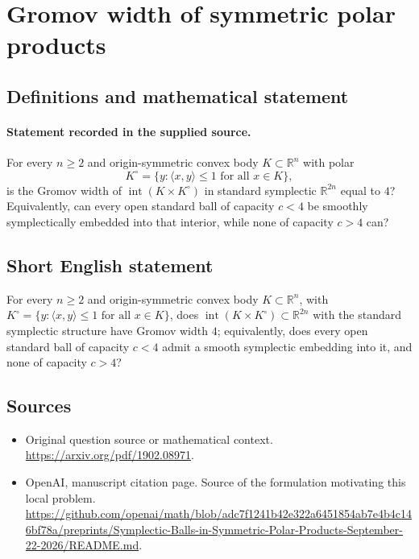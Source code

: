\documentclass[11pt]{article}
\begin{document}
\section*{Gromov width of symmetric polar products}\label{30007128}
\subsection{Definitions and mathematical statement}
\paragraph{Statement recorded in the supplied source.}
For every $n\geq2$ and origin-symmetric convex body $K\subset\mathbb{R}^n$ with polar
\[
K^\circ=\{y:\langle x,y\rangle\leq1\text{ for all }x\in K\},
\]
is the Gromov width of $\operatorname{int}(K\times K^\circ)$ in standard symplectic $\mathbb{R}^{2n}$ equal to $4$? Equivalently, can every open standard ball of capacity $c<4$ be smoothly symplectically embedded into that interior, while none of capacity $c>4$ can?
\subsection{Short English statement}
For every $n\geq2$ and origin-symmetric convex body $K\subset\mathbb{R}^n$, with $K^\circ=\{y:\langle x,y\rangle\leq1\text{ for all }x\in K\}$, does $\operatorname{int}(K\times K^\circ)\subset\mathbb{R}^{2n}$ with the standard symplectic structure have Gromov width $4$; equivalently, does every open standard ball of capacity $c<4$ admit a smooth symplectic embedding into it, and none of capacity $c>4$?
\subsection{Sources}
\begin{itemize}
\item[S1] Original question source or mathematical context.
\url{https://arxiv.org/pdf/1902.08971}.
\item[S2] OpenAI, manuscript citation page. Source of the formulation motivating this local problem.
\url{https://github.com/openai/math/blob/adc7f1241b42e322a6451854ab7e4b4c146bf78a/preprints/Symplectic-Balls-in-Symmetric-Polar-Products-September-22-2026/README.md}.
\end{itemize}
\end{document}
